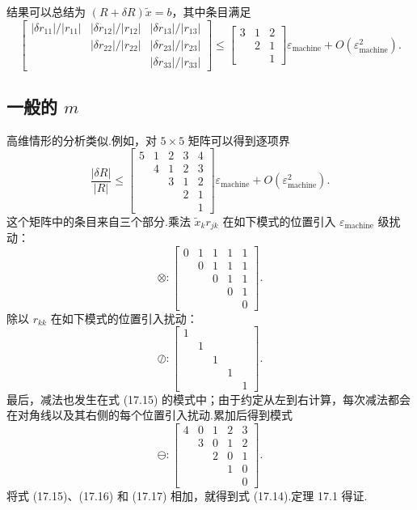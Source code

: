 \documentclass[UTF8,fontset=none,12pt]{ctexart}
\newcommand{\epsmach}{\varepsilon_{\mathrm{machine}}}
\theoremstyle{definition}
\begin{document}
结果可以总结为 $(R+\delta R)\widetilde x=b$，其中条目满足
\[
\begin{bmatrix}
|\delta r_{11}|/|r_{11}|&|\delta r_{12}|/|r_{12}|&|\delta r_{13}|/|r_{13}|\\
&|\delta r_{22}|/|r_{22}|&|\delta r_{23}|/|r_{23}|\\
&&|\delta r_{33}|/|r_{33}|
\end{bmatrix}
\le
\begin{bmatrix}3&1&2\\&2&1\\&&1\end{bmatrix}\epsmach+O(\epsmach^2).
\]

\subsection*{一般的 $m$}

高维情形的分析类似.例如，对 $5\times5$ 矩阵可以得到逐项界
\begin{equation}
\frac{|\delta R|}{|R|}\le
\begin{bmatrix}
5&1&2&3&4\\
&4&1&2&3\\
&&3&1&2\\
&&&2&1\\
&&&&1
\end{bmatrix}\epsmach+O(\epsmach^2).
\tag{17.14}
\end{equation}
这个矩阵中的条目来自三个部分.乘法 $\widetilde x_kr_{jk}$ 在如下模式的位置引入 $\epsmach$ 级扰动：
\begin{equation}
\otimes:
\begin{bmatrix}
0&1&1&1&1\\
&0&1&1&1\\
&&0&1&1\\
&&&0&1\\
&&&&0
\end{bmatrix}.
\tag{17.15}
\end{equation}
除以 $r_{kk}$ 在如下模式的位置引入扰动：
\begin{equation}
\oslash:
\begin{bmatrix}
1&&&&\\
&1&&&\\
&&1&&\\
&&&1&\\
&&&&1
\end{bmatrix}.
\tag{17.16}
\end{equation}
最后，减法也发生在式 (17.15) 的模式中；由于约定从左到右计算，每次减法都会在对角线以及其右侧的每个位置引入扰动.累加后得到模式
\begin{equation}
\ominus:
\begin{bmatrix}
4&0&1&2&3\\
&3&0&1&2\\
&&2&0&1\\
&&&1&0\\
&&&&0
\end{bmatrix}.
\tag{17.17}
\end{equation}
将式 (17.15)、(17.16) 和 (17.17) 相加，就得到式 (17.14).定理 17.1 得证.
\end{document}
